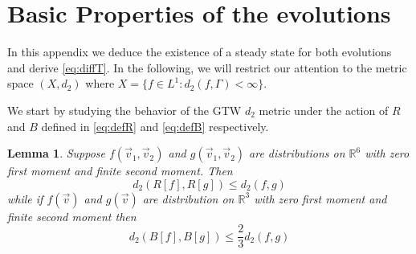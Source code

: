 \documentclass{article}
\newcommand*\R{ \mathds{R} }
\newcommand\vv{{\vec v}}
\newtheorem{mylemma}[mythm]{Lemma}
\begin{document}

\appendix



\section{Basic Properties of the evolutions}\label{app:basic}

In this appendix we deduce the existence of a steady state for both evolutions and derive \eqref{eq:diffT}. In the following, we will restrict our attention to the metric space $(X, d_2)$ where $X = \{f \in L^1: d_2(f, \Gamma) < \infty\}$.

We start by studying the behavior of the GTW $d_2$ metric under the action of $R$ and $B$ defined in
\eqref{eq:defR} and \eqref{eq:defB} respectively.

\begin{mylemma}\label{Lemma:FirstReduction}
Suppose $f(\vv_1,\vv_2)$ and $g(\vv_1,\vv_2)$ are distributions on $\R^6$ with zero first moment and finite second 
moment. Then
\[
d_2(R[f], R[g]) \leq d_2(f, g)
\]
while if $f(\vv)$ and $g(\vv)$ are distribution on $\R^3$ with zero first moment and finite second 
moment then
\[
d_2(B[f], B[g])\leq  \frac23 d_2(f, g)
\]
\end{mylemma}
\end{document}
